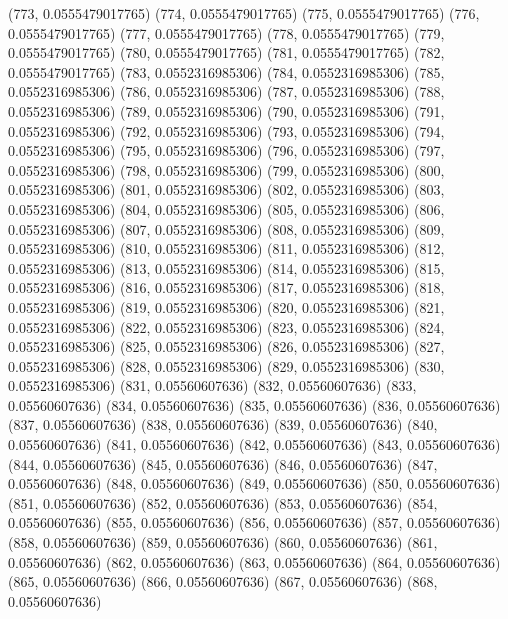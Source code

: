 {					(773, 0.0555479017765)
					(774, 0.0555479017765)
					(775, 0.0555479017765)
					(776, 0.0555479017765)
					(777, 0.0555479017765)
					(778, 0.0555479017765)
					(779, 0.0555479017765)
					(780, 0.0555479017765)
					(781, 0.0555479017765)
					(782, 0.0555479017765)
					(783, 0.0552316985306)
					(784, 0.0552316985306)
					(785, 0.0552316985306)
					(786, 0.0552316985306)
					(787, 0.0552316985306)
					(788, 0.0552316985306)
					(789, 0.0552316985306)
					(790, 0.0552316985306)
					(791, 0.0552316985306)
					(792, 0.0552316985306)
					(793, 0.0552316985306)
					(794, 0.0552316985306)
					(795, 0.0552316985306)
					(796, 0.0552316985306)
					(797, 0.0552316985306)
					(798, 0.0552316985306)
					(799, 0.0552316985306)
					(800, 0.0552316985306)
					(801, 0.0552316985306)
					(802, 0.0552316985306)
					(803, 0.0552316985306)
					(804, 0.0552316985306)
					(805, 0.0552316985306)
					(806, 0.0552316985306)
					(807, 0.0552316985306)
					(808, 0.0552316985306)
					(809, 0.0552316985306)
					(810, 0.0552316985306)
					(811, 0.0552316985306)
					(812, 0.0552316985306)
					(813, 0.0552316985306)
					(814, 0.0552316985306)
					(815, 0.0552316985306)
					(816, 0.0552316985306)
					(817, 0.0552316985306)
					(818, 0.0552316985306)
					(819, 0.0552316985306)
					(820, 0.0552316985306)
					(821, 0.0552316985306)
					(822, 0.0552316985306)
					(823, 0.0552316985306)
					(824, 0.0552316985306)
					(825, 0.0552316985306)
					(826, 0.0552316985306)
					(827, 0.0552316985306)
					(828, 0.0552316985306)
					(829, 0.0552316985306)
					(830, 0.0552316985306)
					(831, 0.05560607636)
					(832, 0.05560607636)
					(833, 0.05560607636)
					(834, 0.05560607636)
					(835, 0.05560607636)
					(836, 0.05560607636)
					(837, 0.05560607636)
					(838, 0.05560607636)
					(839, 0.05560607636)
					(840, 0.05560607636)
					(841, 0.05560607636)
					(842, 0.05560607636)
					(843, 0.05560607636)
					(844, 0.05560607636)
					(845, 0.05560607636)
					(846, 0.05560607636)
					(847, 0.05560607636)
					(848, 0.05560607636)
					(849, 0.05560607636)
					(850, 0.05560607636)
					(851, 0.05560607636)
					(852, 0.05560607636)
					(853, 0.05560607636)
					(854, 0.05560607636)
					(855, 0.05560607636)
					(856, 0.05560607636)
					(857, 0.05560607636)
					(858, 0.05560607636)
					(859, 0.05560607636)
					(860, 0.05560607636)
					(861, 0.05560607636)
					(862, 0.05560607636)
					(863, 0.05560607636)
					(864, 0.05560607636)
					(865, 0.05560607636)
					(866, 0.05560607636)
					(867, 0.05560607636)
					(868, 0.05560607636)
}
